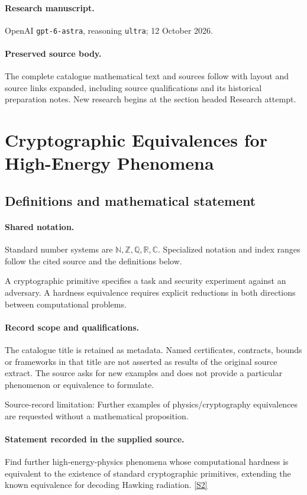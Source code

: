 \documentclass[11pt]{article}
\begin{document}
\paragraph{Research manuscript.} OpenAI \texttt{gpt-6-astra}, reasoning \texttt{ultra}; 12 October 2026.
\paragraph{Preserved source body.} The complete catalogue mathematical text and sources follow with layout and source links expanded, including source qualifications and its historical preparation notes. New research begins at the section headed Research attempt.

\section{Cryptographic Equivalences for High-Energy Phenomena}\label{statement}

\subsection{Definitions and mathematical statement}

\paragraph{Shared notation.}Standard number systems are $\mathbb N,\mathbb Z,\mathbb Q,\mathbb R,\mathbb C$. Specialized notation and index ranges follow the cited source and the definitions below.


A cryptographic primitive specifies a task and security experiment against an adversary. A hardness equivalence requires explicit reductions in both directions between computational problems.
\paragraph{Record scope and qualifications.}
The catalogue title is retained as metadata. Named certificates, contracts, bounds or frameworks in that title are not asserted as results of the original source extract.
The source asks for new examples and does not provide a particular phenomenon or equivalence to formulate.

Source-record limitation: Further examples of physics/cryptography equivalences are requested without a mathematical proposition.
\paragraph{Statement recorded in the supplied source.}
Find further high-energy-physics phenomena whose computational hardness is equivalent to the existence of standard cryptographic primitives, extending the known equivalence for decoding Hawking radiation. \href{https://doi.org/10.4171/owr/2025/3}{[S2]}
\end{document}
